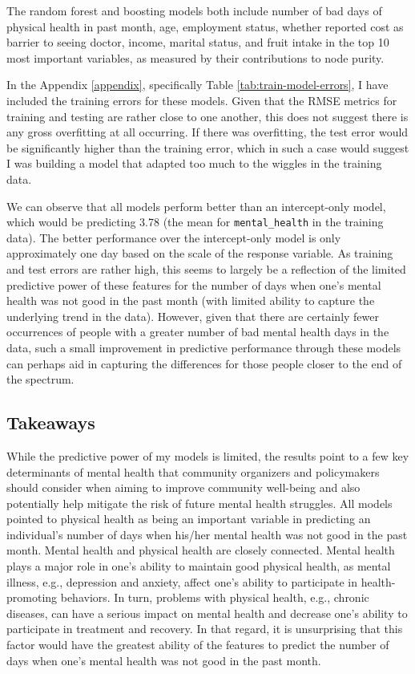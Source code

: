 \documentclass[
]{article}
\begin{document}
The random forest and boosting models both include number of bad days of physical health in past month, age, employment status, whether reported cost as barrier to seeing doctor, income, marital status, and fruit intake in the top 10 most important variables, as measured by their contributions to node purity.

In the Appendix \ref{appendix}, specifically Table \ref{tab:train-model-errors}, I have included the training errors for these models. Given that the RMSE metrics for training and testing are rather close to one another, this does not suggest there is any gross overfitting at all occurring. If there was overfitting, the test error would be significantly higher than the training error, which in such a case would suggest I was building a model that adapted too much to the wiggles in the training data.

We can observe that all models perform better than an intercept-only model, which would be predicting 3.78 (the mean for \texttt{mental\_health} in the training data). The better performance over the intercept-only model is only approximately one day based on the scale of the response variable. As training and test errors are rather high, this seems to largely be a reflection of the limited predictive power of these features for the number of days when one's mental health was not good in the past month (with limited ability to capture the underlying trend in the data). However, given that there are certainly fewer occurrences of people with a greater number of bad mental health days in the data, such a small improvement in predictive performance through these models can perhaps aid in capturing the differences for those people closer to the end of the spectrum.

\hypertarget{takeaways}{%
\subsection{Takeaways}\label{takeaways}}

While the predictive power of my models is limited, the results point to a few key determinants of mental health that community organizers and policymakers should consider when aiming to improve community well-being and also potentially help mitigate the risk of future mental health struggles. All models pointed to physical health as being an important variable in predicting an individual's number of days when his/her mental health was not good in the past month. Mental health and physical health are closely connected. Mental health plays a major role in one's ability to maintain good physical health, as mental illness, e.g., depression and anxiety, affect one's ability to participate in health-promoting behaviors. In turn, problems with physical health, e.g., chronic diseases, can have a serious impact on mental health and decrease one's ability to participate in treatment and recovery. In that regard, it is unsurprising that this factor would have the greatest ability of the features to predict the number of days when one's mental health was not good in the past month.
\end{document}
